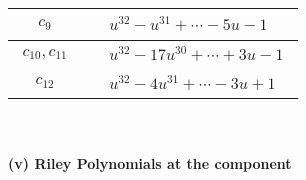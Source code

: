 \documentclass[1p]{elsarticle_modified}
\theoremstyle{definition}
\begin{document}
\begin{tabular}{m{50pt}|m{274pt}}
\hline $$\begin{aligned}c_{9}\end{aligned}$$&$\begin{aligned}
&u^{32}- u^{31}+\cdots-5 u-1
\end{aligned}$\\
\hline $$\begin{aligned}c_{10},c_{11}\end{aligned}$$&$\begin{aligned}
&u^{32}-17 u^{30}+\cdots+3 u-1
\end{aligned}$\\
\hline $$\begin{aligned}c_{12}\end{aligned}$$&$\begin{aligned}
&u^{32}-4 u^{31}+\cdots-3 u+1
\end{aligned}$\\
\hline
\end{tabular}\\~\\
\newpage\renewcommand{\arraystretch}{1}
\flushleft \textbf{(v) Riley Polynomials at the component}\newline \\
\end{document}
